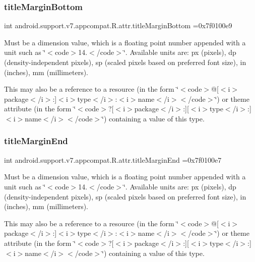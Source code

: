 \subsubsection{\texorpdfstring{title\+Margin\+Bottom}{titleMarginBottom}}
{\footnotesize\ttfamily int android.\+support.\+v7.\+appcompat.\+R.\+attr.\+title\+Margin\+Bottom =0x7f0100e9\hspace{0.3cm}{\ttfamily [static]}}

Must be a dimension value, which is a floating point number appended with a unit such as \char`\"{}$<$code$>$14.\+5sp$<$/code$>$\char`\"{}. Available units are\+: px (pixels), dp (density-\/independent pixels), sp (scaled pixels based on preferred font size), in (inches), mm (millimeters). 

This may also be a reference to a resource (in the form \char`\"{}$<$code$>$@\mbox{[}$<$i$>$package$<$/i$>$\+:\mbox{]}$<$i$>$type$<$/i$>$\+:$<$i$>$name$<$/i$>$$<$/code$>$\char`\"{}) or theme attribute (in the form \char`\"{}$<$code$>$?\mbox{[}$<$i$>$package$<$/i$>$\+:\mbox{]}\mbox{[}$<$i$>$type$<$/i$>$\+:\mbox{]}$<$i$>$name$<$/i$>$$<$/code$>$\char`\"{}) containing a value of this type. \mbox{\label{classandroid_1_1support_1_1v7_1_1appcompat_1_1R_1_1attr_a4bfe0ae1fc33a1dcc037e2c098be342c}} 
\subsubsection{\texorpdfstring{title\+Margin\+End}{titleMarginEnd}}
{\footnotesize\ttfamily int android.\+support.\+v7.\+appcompat.\+R.\+attr.\+title\+Margin\+End =0x7f0100e7\hspace{0.3cm}{\ttfamily [static]}}

Must be a dimension value, which is a floating point number appended with a unit such as \char`\"{}$<$code$>$14.\+5sp$<$/code$>$\char`\"{}. Available units are\+: px (pixels), dp (density-\/independent pixels), sp (scaled pixels based on preferred font size), in (inches), mm (millimeters). 

This may also be a reference to a resource (in the form \char`\"{}$<$code$>$@\mbox{[}$<$i$>$package$<$/i$>$\+:\mbox{]}$<$i$>$type$<$/i$>$\+:$<$i$>$name$<$/i$>$$<$/code$>$\char`\"{}) or theme attribute (in the form \char`\"{}$<$code$>$?\mbox{[}$<$i$>$package$<$/i$>$\+:\mbox{]}\mbox{[}$<$i$>$type$<$/i$>$\+:\mbox{]}$<$i$>$name$<$/i$>$$<$/code$>$\char`\"{}) containing a value of this type. \mbox{\label{classandroid_1_1support_1_1v7_1_1appcompat_1_1R_1_1attr_ad8d424270f154ae84996d3d49a832ee6}} 
